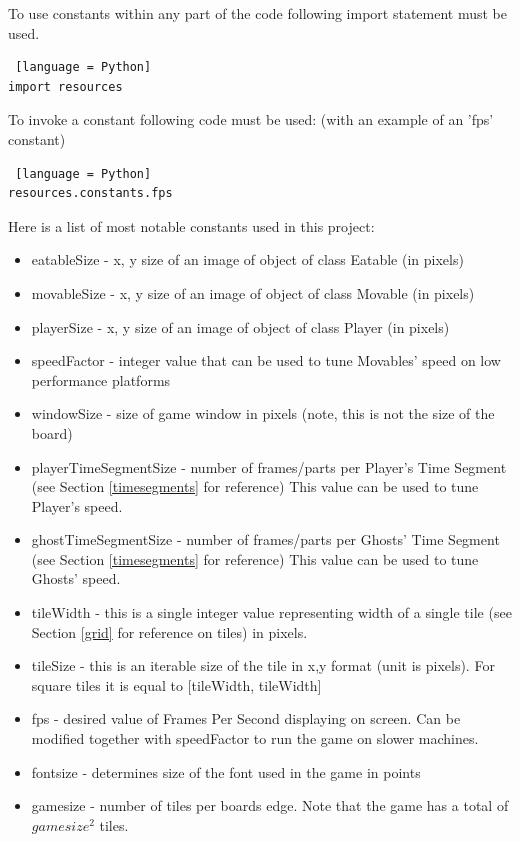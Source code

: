 \documentclass[11pt,a4paper]{report}
\begin{document}
				To use constants within any part of the code following import statement must be used.
				\begin{lstlisting} [language = Python]
import resources
				\end{lstlisting}
				To invoke a constant following code must be used: (with an example of an 'fps' constant)
				\begin{lstlisting} [language = Python]
resources.constants.fps
				\end{lstlisting}
				Here is a list of most notable constants used in this project:
				\begin{itemize}
					\item
						eatableSize - x, y size of an image of object of class Eatable (in pixels)
					\item
						movableSize - x, y size of an image of object of class Movable (in pixels)
					\item
						playerSize - x, y size of an image of object of class Player (in pixels)
					\item
						speedFactor - integer value that can be used to tune Movables' speed on low performance platforms
					\item
						windowSize - size of game window in pixels (note, this is not the size of the board)
					\item
						playerTimeSegmentSize - number of frames/parts per Player's Time Segment (see Section \ref{timesegments} for reference) This value can be used to tune Player's speed.
					\item
						ghostTimeSegmentSize - number of frames/parts per Ghosts' Time Segment (see Section \ref{timesegments} for reference)  This value can be used to tune Ghosts' speed.
					\item
						tileWidth - this is a single integer value representing width of a single tile (see Section \ref{grid} for reference on tiles) in pixels.
					\item
						tileSize - this is an iterable size of the tile in x,y format (unit is pixels). For square tiles it is equal to [tileWidth, tileWidth]
					\item
						fps - desired value of Frames Per Second displaying on screen. Can be modified together with speedFactor to run the game on slower machines.
					\item
						fontsize - determines size of the font used in the game in points
					\item
						gamesize - number of tiles per boards edge. Note that the game has a total of $gamesize^2$ tiles.

\end{itemize}
\end{document}
